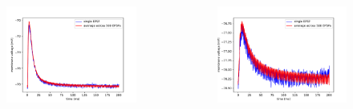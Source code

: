 \documentclass{beamer}
\begin{document}
\begin{frame}
	\begin{columns}
          	\begin{figure}
    				\centering
    				\includegraphics[width=\linewidth]{figures/epsp_out_+.pdf}
 		   \end{figure}


          \begin{figure}
    				\centering
    				\includegraphics[width=\linewidth]{figures/epsp_out_-.pdf}
 		   \end{figure}


	\end{columns}

\end{frame}
\end{document}
